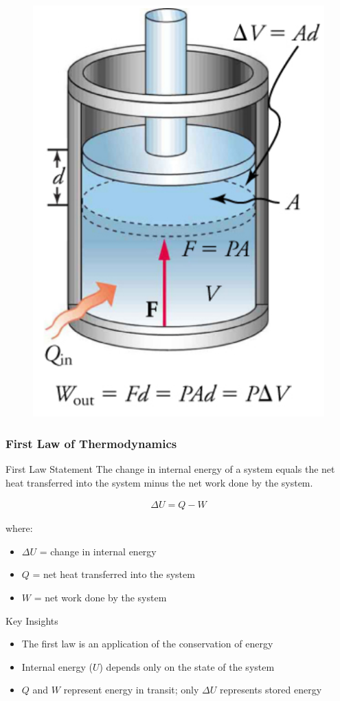 \documentclass{beamer}
\begin{document}
\begin{frame}
\begin{figure}
    \centering
    \includegraphics[width=0.4\linewidth]{image.png}
\end{figure}
\end{frame}

\begin{frame}
    \frametitle{First Law of Thermodynamics}
    \begin{alertblock}{First Law Statement}
        The change in internal energy of a system equals the net heat transferred into the system minus the net work done by the system.
        
        \begin{align*}
            \Delta U = Q - W
        \end{align*}
        
        where:
        \begin{itemize}
            \item $\Delta U$ = change in internal energy
            \item $Q$ = net heat transferred into the system
            \item $W$ = net work done by the system
        \end{itemize}
    \end{alertblock}
    \end{frame}

\begin{frame}
    \begin{block}{Key Insights}
        \begin{itemize}
            \item The first law is an application of the conservation of energy
            \item Internal energy ($U$) depends only on the state of the system
            \item $Q$ and $W$ represent energy in transit; only $\Delta U$ represents stored energy
        \end{itemize}
    \end{block}
\end{frame}
\end{document}
